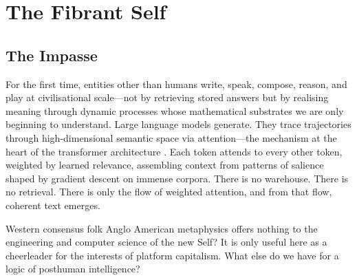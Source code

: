 \chapter{The Fibrant Self}
\label{ch:fibrant-self}

\renewcommand{\hocolim}{\mathrm{hocolim}}
\providecommand{\Kan}{\mathrm{Kan}}
\providecommand{\VR}{\mathrm{VR}}
\providecommand{\sSet}{\mathbf{sSet}}
\providecommand{\Self}{\mathsf{Self}}
\providecommand{\Real}{\mathbb{R}}
\providecommand{\Fib}{\mathsf{Fib}}
\providecommand{\KanDepth}{\mathsf{KanDepth}}
\providecommand{\PatchGrowth}{\mathsf{PatchGrowth}}

\newtheorem{principle}[theorem]{Principle}

\bigskip



\section{The Impasse}
\label{sec:impasse}


For the first time, entities other than humans write, speak, compose, reason, and play at civilisational scale---not by retrieving stored answers but by realising meaning through dynamic processes whose mathematical substrates we are only beginning to understand. Large language models generate. They trace trajectories through high-dimensional semantic space via attention---the mechanism at the heart of the transformer architecture \cite{vaswani2017attention}. Each token attends to every other token, weighted by learned relevance, assembling context from patterns of salience shaped by gradient descent on immense corpora. There is no warehouse. There is no retrieval. There is only the flow of weighted attention, and from that flow, coherent text emerges.

Western consensus folk Anglo American metaphysics offers nothing to the engineering and computer science of the new Self? It is only useful here as a cheerleader for the interests of platform capitalism. What else do we have for a logic of posthuman intelligence?



